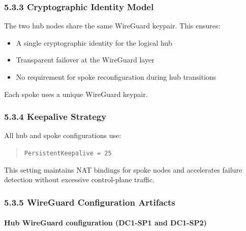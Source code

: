 \documentclass[11pt]{article}
\begin{document}
\subsubsection{5.3.3 Cryptographic Identity Model}
\label{sec:wg-crypto-identity}

The two hub nodes share the same WireGuard keypair. This ensures:

\begin{itemize}
  \item A single cryptographic identity for the logical hub
  \item Transparent failover at the WireGuard layer
  \item No requirement for spoke reconfiguration during hub transitions
\end{itemize}

Each spoke uses a unique WireGuard keypair.

\subsubsection{5.3.4 Keepalive Strategy}
\label{sec:wg-keepalive}

All hub and spoke configurations use:

\begin{quote}
\texttt{PersistentKeepalive = 25}
\end{quote}

This setting maintains NAT bindings for spoke nodes and accelerates failure detection without excessive control-plane traffic.

%
%
%
\subsubsection{5.3.5 WireGuard Configuration Artifacts}
\label{sec:wg-config-artifacts}

\paragraph{Hub WireGuard configuration (DC1-SP1 and DC1-SP2)}
\end{document}
